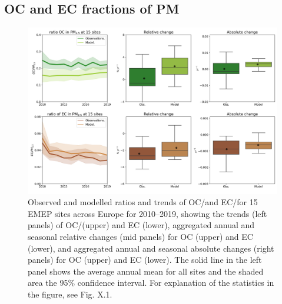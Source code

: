 



\subsection{OC and EC fractions of PM}
\label{ss:OCECfrac}


\begin{figure}
\includegraphics[width=16cm]{FIGS_TRENDS/ECOC_ratio_trends.png}
 \caption{Observed and modelled ratios and trends of OC/\pmfine and EC/\pmfine for
  15 EMEP sites across Europe for 2010--2019, showing the trends
  (left panels) of OC/\pmfine (upper) and EC (lower), aggregated annual and
  seasonal relative changes (mid panels) for OC (upper) and EC (lower),
  and aggregated annual and seasonal absolute changes (right panels)
  for OC (upper) and EC (lower). The solid line in the left panel shows
  the average annual mean for all sites and the shaded area the 95\%
  confidence interval. For explanation of the statistics in the figure,
  see Fig. X.1. \label{fig:KEX3}
 }
\end{figure}

